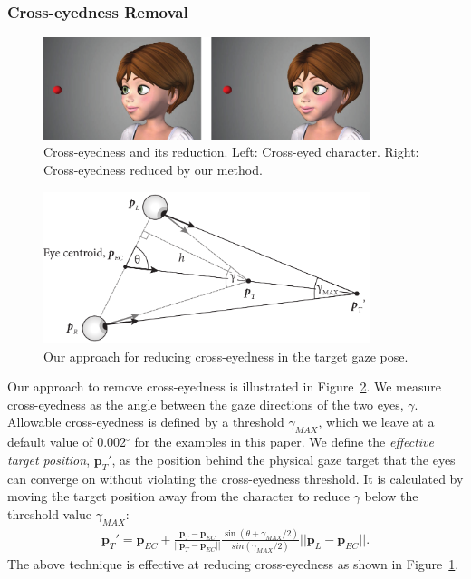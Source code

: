 \subsubsection{Cross-eyedness Removal}

\begin{figure}
\centering
\includegraphics[width=0.85\textwidth]{stylizedgaze/Figures/CrosseyednessFixExample-small.pdf}
\caption{Cross-eyedness and its reduction. Left: Cross-eyed character. Right: Cross-eyedness reduced by our method.}
\label{fig:CrosseyednessFixExample}
\end{figure}

\begin{figure}
\centering
\includegraphics[width=0.85\textwidth]{stylizedgaze/Figures/CrosseyednessRemoval.pdf}
\caption{Our approach for reducing cross-eyedness in the target gaze pose.}
\label{fig:CrosseyednessRemoval}
\end{figure}

Our approach to remove cross-eyedness is illustrated in Figure~\ref{fig:CrosseyednessRemoval}. We measure cross-eyedness as the angle between the gaze directions of the two eyes, $\gamma$. Allowable cross-eyedness is defined by a threshold $\gamma_{MAX}$, which we leave at a default value of 0.002$^{\circ}$ for the examples in this paper.
We define the \textit{effective target position}, $\mathbf{p}_T'$, as the position behind the physical gaze target that the eyes can converge on without violating the cross-eyedness threshold. It is calculated by moving the target position away from the character to reduce $\gamma$ below the threshold value $\gamma_{MAX}$:
%
\begin{align}
\mathbf{p}_T' = \mathbf{p}_{EC} + \frac{\mathbf{p}_T - \mathbf{p}_{EC}}{||\mathbf{p}_T - \mathbf{p}_{EC}||} \frac{\sin(\theta + \gamma_{MAX}/2)}{sin(\gamma_{MAX}/2)}||\mathbf{p}_L - \mathbf{p}_{EC}||.
\end{align}
%
The above technique is effective at reducing cross-eyedness as shown in Figure~\ref{fig:CrosseyednessFixExample}.


